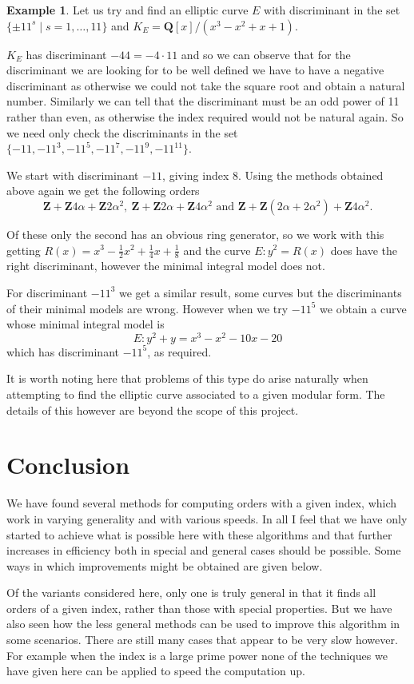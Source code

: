 \documentclass[12pt,a4paper,abstracton,bibtotoc]{scrreprt}
\theoremstyle{definition}
\newtheorem{ex}{Example}
\newcommand{\QQ}{\mathbf{Q}}
\newcommand{\ZZ}{\mathbf{Z}}
\begin{document}
\begin{ex}
Let us try and find an elliptic curve $E$ with discriminant in the set $\{\pm 11^s\mid s = 1,\ldots,11\}$ and $K_E = \QQ[x]/(x^3 - x^2 + x + 1)$.

$K_E$ has discriminant $-44 = -4\cdot 11$ and so we can observe that for the discriminant we are looking for to be well defined we have to have a negative discriminant as otherwise we could not take the square root and obtain a natural number.
Similarly we can tell that the discriminant must be an odd power of 11 rather than even, as otherwise the index required would not be natural again.
So we need only check the discriminants in the set $\{-11,-11^3,-11^5,-11^7,-11^9,-11^{11}\}$.

We start with discriminant $-11$, giving index 8.
Using the methods obtained above again we get the following orders
\[
\ZZ + \ZZ4\alpha + \ZZ2\alpha^2,\ \ZZ + \ZZ2\alpha + \ZZ4\alpha^2\text{ and } \ZZ + \ZZ(2\alpha + 2\alpha^2) + \ZZ4\alpha^2.
\]

Of these only the second has an obvious ring generator, so we work with this getting $R(x) = x^3 -\frac{1}{2}x^2 + \frac{1}{4}x + \frac{1}{8}$ and the curve $E\colon y^2 = R(x)$ does have the right discriminant, however the minimal integral model does not.

For discriminant $-11^3$ we get a similar result, some curves but the discriminants of their minimal models are wrong.
However when we try $-11^5$ we obtain a curve whose minimal integral model is
\[
E\colon y^2 + y = x^3 - x^2 - 10x - 20
\]
which has discriminant $-11^5$, as required.

It is worth noting here that problems of this type do arise naturally when attempting to find the elliptic curve associated to a given modular form.
The details of this however are beyond the scope of this project.
\end{ex}

\chapter{Conclusion}
We have found several methods for computing orders with a given index, which work in varying generality and with various speeds.
In all I feel that we have only started to achieve what is possible here with these algorithms and that further increases in efficiency both in special and general cases should be possible.
Some ways in which improvements might be obtained are given below.

Of the variants considered here, only one is truly general in that it finds all orders of a given index, rather than those with special properties.
But we have also seen how the less general methods can be used to improve this algorithm in some scenarios.
There are still many cases that appear to be very slow however.
For example when the index is a large prime power none of the techniques we have given here can be applied to speed the computation up.
\end{document}
